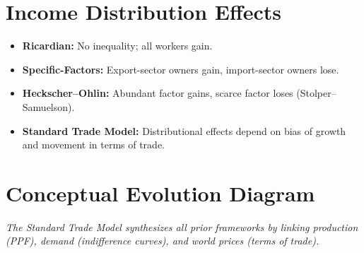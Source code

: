 \documentclass[12pt]{article}
\begin{document}
\section*{Income Distribution Effects}
\begin{itemize}
\item \textbf{Ricardian:} No inequality; all workers gain.
\item \textbf{Specific-Factors:} Export-sector owners gain, import-sector owners lose.
\item \textbf{Heckscher--Ohlin:} Abundant factor gains, scarce factor loses (Stolper--Samuelson).
\item \textbf{Standard Trade Model:} Distributional effects depend on bias of growth and movement in terms of trade.
\end{itemize}

\vspace{1em}

\section*{Conceptual Evolution Diagram}

\begin{center}
\end{center}

\vspace{0.6em}

\textit{The Standard Trade Model synthesizes all prior frameworks by linking production (PPF), demand (indifference curves), and world prices (terms of trade).}

\newpage

\end{document}
